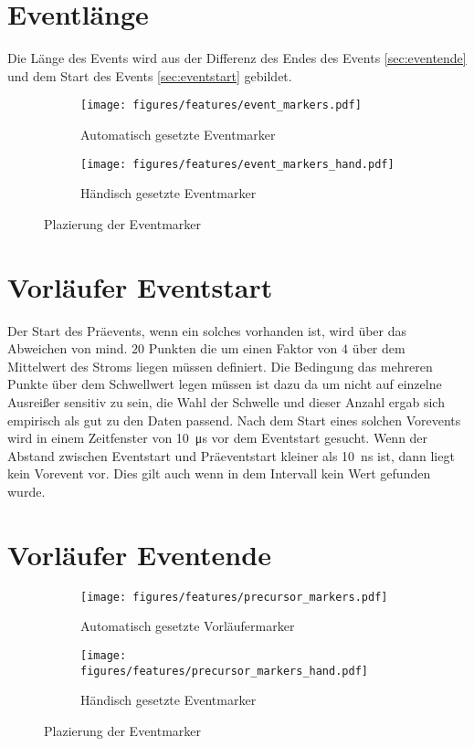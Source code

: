 \section{Eventlänge}
\label{sec:eventlen}
Die Länge des Events wird aus der Differenz des Endes des Events \ref{sec:eventende} und dem Start des Events \ref{sec:eventstart} gebildet. 
\begin{figure}[H]
  \centering
  \begin{subfigure}[t]{0.48\textwidth}
    \centering
    \texttt{[image: figures/features/event\_markers.pdf]}
    \caption{Automatisch gesetzte Eventmarker}
    \label{fig:event_markers_auto}
  \end{subfigure}
  \begin{subfigure}[t]{0.48\textwidth}
    \centering
    \texttt{[image: figures/features/event\_markers\_hand.pdf]}
    \caption{Händisch gesetzte Eventmarker}
    \label{fig:event_markers_hand}
  \end{subfigure}
  \caption{Plazierung der Eventmarker}
  \label{fig:event_markers}
\end{figure}


\section{Vorläufer Eventstart}
\label{sec:preeventstart}

Der Start des Präevents, wenn ein solches vorhanden ist, wird über das Abweichen von mind. $20$ Punkten die um einen Faktor von $4$ über dem Mittelwert des Stroms liegen müssen definiert. Die Bedingung das mehreren Punkte über dem Schwellwert legen müssen ist dazu da um nicht auf einzelne Ausreißer sensitiv zu sein, die Wahl der Schwelle und dieser Anzahl ergab sich empirisch als gut zu den Daten passend. Nach dem Start eines solchen Vorevents wird in einem Zeitfenster von \SI{10}{\micro\second} vor dem Eventstart gesucht. Wenn der Abstand zwischen Eventstart und Präeventstart kleiner als \SI{10}{\nano\second} ist, dann liegt kein Vorevent vor. Dies gilt auch wenn in dem Intervall kein Wert gefunden wurde.

\section{Vorläufer Eventende}
\label{sec.preeventend}

\begin{figure}[H]
  \centering
  \begin{subfigure}[t]{0.48\textwidth}
    \centering
    \texttt{[image: figures/features/precursor\_markers.pdf]}
    \caption{Automatisch gesetzte Vorläufermarker}
    \label{fig:precursor_markers_auto}
  \end{subfigure}
  \begin{subfigure}[t]{0.48\textwidth}
    \centering
    \texttt{[image: figures/features/precursor\_markers\_hand.pdf]}
    \caption{Händisch gesetzte Eventmarker}
    \label{fig:precursor_markers_hand}
  \end{subfigure}
  \caption{Plazierung der Eventmarker}
  \label{fig:precursor_markers}
\end{figure}




